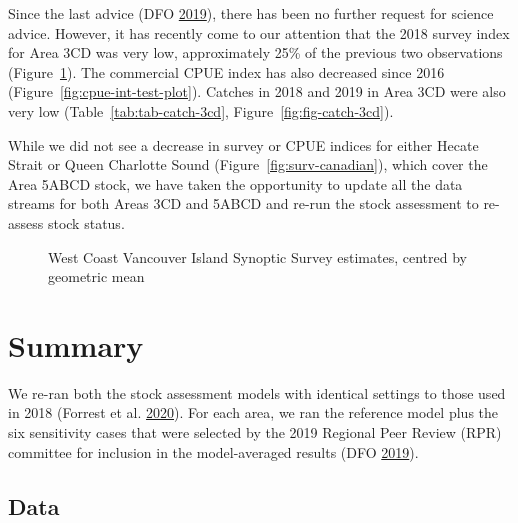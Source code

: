 \documentclass[11pt]{book}
\begin{document}
Since the last advice (DFO \protect\hyperlink{ref-dfo2019}{2019}), there has been no further request for science advice. However, it has recently come to our attention that the 2018 survey index for Area 3CD was very low, approximately 25\% of the previous two observations (Figure~\ref{fig:fig-wcvi-index-3cd}). The commercial CPUE index has also decreased since 2016 (Figure~\ref{fig:cpue-int-test-plot}). Catches in 2018 and 2019 in Area 3CD were also very low (Table~\ref{tab:tab-catch-3cd}, Figure~\ref{fig:fig-catch-3cd}).

While we did not see a decrease in survey or CPUE indices for either Hecate Strait or Queen Charlotte Sound (Figure~\ref{fig:surv-canadian}), which cover the Area 5ABCD stock, we have taken the opportunity to update all the data streams for both Areas 3CD and 5ABCD and re-run the stock assessment to re-assess stock status.
\begin{figure}[htb]

{\centering {} 

}

\caption{West Coast Vancouver Island Synoptic Survey estimates, centred by geometric mean}\label{fig:fig-wcvi-index-3cd}
\end{figure}
\clearpage

\hypertarget{summary}{%
\section{Summary}\label{summary}}

We re-ran both the stock assessment models with identical settings to those used in 2018 (Forrest et al. \protect\hyperlink{ref-forrest2020}{2020}). For each area, we ran the reference model plus the six sensitivity cases that were selected by the 2019 Regional Peer Review (RPR) committee for inclusion in the model-averaged results (DFO \protect\hyperlink{ref-dfo2019}{2019}).

\hypertarget{data}{%
\subsection{Data}\label{data}}
\end{document}
